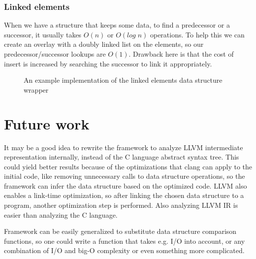 \documentclass[a4paper,11pt]{article}
\begin{document}
        \subsubsection{Linked elements}\label{sec:gdsm:le}

			When we have a structure that keeps some data, to find a predecessor or a successor, it usually
			takes $O(n)$ or $O(log \; n)$ operations.  To help this we can create an overlay with a doubly
			linked list on the elements, so our predecessor/successor lookups are $O(1)$. Drawback here is
			that the cost of insert is increased by searching the successor to link it appropriately.

			\begin{figure}
				

				\caption{An example implementation of the linked elements data structure wrapper}

				\label{fig:linked-cache}
			\end{figure}

\section{Future work} \label{sec:future}
	It may be a good idea to rewrite the framework to analyze LLVM\cite{LLVM} intermediate representation internally,
    instead of the C language abstract syntax tree. This could yield better results because of the optimizations that clang
    \cite{Clang} can apply to
	the initial code, like removing unnecessary calls to data structure operations, so the framework can infer the
	data structure based on the optimized code. LLVM also enables a link-time optimization, so after linking the
	chosen data structure to a program, another optimization step is performed. Also analyzing LLVM IR is easier
	than analyzing the C language.

    Framework can be easily generalized to substitute data structure comparison functions, so one could write a function
    that takes e.g. I/O into account, or any combination of I/O and big-O complexity or even something more complicated.
\end{document}
